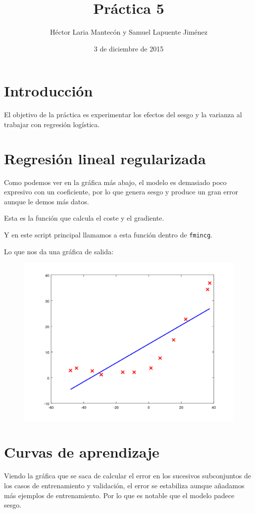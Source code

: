 \documentclass{article}
\title{Práctica 5}
\author{Héctor Laria Mantecón y Samuel Lapuente Jiménez}
\date{3 de diciembre de 2015}
\begin{document}
\maketitle

\section{Introducción}
El objetivo de la práctica es experimentar los efectos del sesgo y la varianza al trabajar con regresión logística.

\section{Regresión lineal regularizada}
Como podemos ver en la gráfica más abajo, el modelo es demasiado poco expresivo con un coeficiente, por lo que genera sesgo y produce un gran error aunque le demos más datos.

Esta es la función que calcula el coste y el gradiente.

Y en este script principal llamamos a esta función dentro de {\tt fmincg}.


Lo que nos da una gráfica de salida:
\begin{figure}[h]
\centering
\includegraphics[width=\textwidth]{1}
\end{figure}

\pagebreak
\section{Curvas de aprendizaje}
Viendo la gráfica que se saca de calcular el error en los sucesivos subconjuntos de los casos de entrenamiento y validación, el error se estabiliza aunque añadamos más ejemplos de entrenamiento. Por lo que es notable que el modelo padece sesgo.
\end{document}
